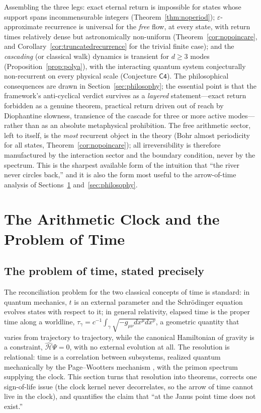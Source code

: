 \documentclass[11pt,a4paper]{article}
\theoremstyle{plain}
\theoremstyle{definition}
\theoremstyle{remark}
\newcommand{\Hmax}{\widehat{\mathcal{H}}}
\begin{document}
Assembling the three legs: exact eternal return is impossible for states whose support spans
incommensurable integers (Theorem~\ref{thm:noperiod}); $\varepsilon$-approximate recurrence is
universal for the \emph{free} flow, at every state, with return times relatively dense but
astronomically non-uniform (Theorem~\ref{cor:nopoincare}, and
Corollary~\ref{cor:truncatedrecurrence} for the trivial finite case); and the \emph{cascading}
(or classical walk) dynamics is transient for $d\geq3$ modes (Proposition~\ref{prop:polya}),
with the interacting quantum system conjecturally non-recurrent on every physical scale
(Conjecture $\mathsf{C4}$). The philosophical consequences
are drawn in Section~\ref{sec:philosophy}; the essential point is that the framework's
anti-cyclical verdict survives as a \emph{layered} statement---exact return forbidden as a
genuine theorem, practical return driven out of reach by Diophantine slowness, transience
of the cascade for three or more active modes---rather than as an absolute metaphysical
prohibition. The free arithmetic sector, left to itself, is the \emph{most} recurrent object
in the theory (Bohr almost periodicity for all states, Theorem~\ref{cor:nopoincare}); all
irreversibility is therefore manufactured by the interaction sector and the boundary
condition, never by the spectrum. This is the sharpest available form of the intuition
that ``the river never circles back,'' and it is also the form most useful to
the arrow-of-time analysis of Sections~\ref{sec:time} and~\ref{sec:philosophy}.

\section{The Arithmetic Clock and the Problem of Time}\label{sec:time}

\subsection{The problem of time, stated precisely}

The reconciliation problem for the two classical concepts of time is standard: in
quantum mechanics, $t$ is an external parameter and the Schr{\"o}dinger equation evolves
states with respect to it; in general relativity, elapsed time is the proper time along a
worldline, $\tau_{\gamma}=c^{-1}\int_{\gamma}\sqrt{-g_{\mu\nu}dx^{\mu}dx^{\nu}}$, a geometric
quantity that varies from trajectory to trajectory, while the canonical Hamiltonian of
gravity is a constraint, $\Hmax\Psi=0$, with no external evolution at all. The
resolution is relational: time is a correlation between subsystems, realized quantum
mechanically by the Page--Wootters mechanism \cite{pagewootters1983}, with the primon
spectrum supplying the clock. This section turns that resolution into theorems, corrects
one sign-of-life issue (the clock kernel never decorrelates, so the arrow
of time cannot live in the clock), and quantifies the claim that ``at the
Janus point time does not exist.''
\end{document}

